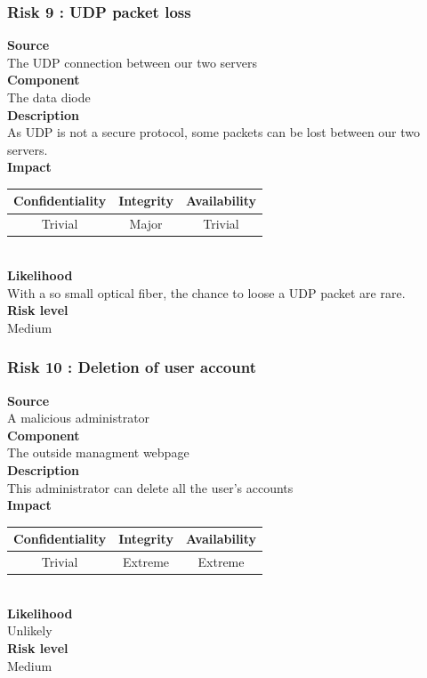 \documentclass[a4paper,11pt]{article}
\begin{document}
\subsubsection{Risk 9 : UDP packet loss  }
\textbf{Source} \\The UDP connection between our two servers \\
\textbf{Component} \\The data diode\\
\textbf{Description}\\As UDP is not a secure protocol, some packets can be lost between our two servers. \\
\textbf{Impact}\\
\begin{tabular}{|c|c|c|}
\hline
Confidentiality & Integrity & Availability \\
\hline
Trivial & Major & Trivial \\
\hline
\end{tabular}\\
\textbf{Likelihood}\\ With a so small optical fiber, the chance to loose a UDP packet are rare.\\
\textbf{Risk level}\\Medium\\

\subsubsection{Risk 10 : Deletion of user account }
\textbf{Source} \\A malicious administrator \\
\textbf{Component} \\The outside managment webpage\\
\textbf{Description}\\This administrator can delete all the user's accounts \\
\textbf{Impact}\\
\begin{tabular}{|c|c|c|}
\hline
Confidentiality & Integrity & Availability \\
\hline
Trivial & Extreme & Extreme \\
\hline
\end{tabular}\\
\textbf{Likelihood}\\ Unlikely\\
\textbf{Risk level}\\Medium\\
\end{document}
